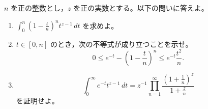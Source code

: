 \newcommand{\C}{\mathbb{C}}
\newcommand{\R}{\mathbb{R}}
\newcommand{\Z}{\mathbb{Z}}
\newcommand{\Tr}{\operatorname{Tr}}
\newcommand{\Impart}{\operatorname{Im}}
\newcommand{\AF}{\operatorname{AF}}
\newcommand{\AX}{\operatorname{AX}}
\newcommand{\GL}{\operatorname{GL}}


\(n\) を正の整数とし，\(z\) を正の実数とする。以下の問いに答えよ。

\begin{enumerate}
  \item \(\displaystyle \int_0^n \left(1-\frac{t}{n}\right)^n t^{z-1}\,dt\) を求めよ。
  \item \(t\in[0,n]\) のとき，次の不等式が成り立つことを示せ。
  \[
    0\le e^{-t}-\left(1-\frac{t}{n}\right)^n
      \le e^{-t}\frac{t^2}{n}.
  \]
  \item
  \[
    \int_0^\infty e^{-t}t^{z-1}\,dt
      =z^{-1}\prod_{n=1}^{\infty}\frac{\left(1+\frac1n\right)^z}{1+\frac{z}{n}}
  \]
  を証明せよ。
\end{enumerate}

%
